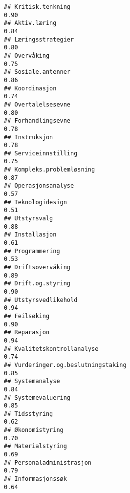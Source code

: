 \documentclass[
]{article}
\begin{document}
\begin{verbatim}
## Kritisk.tenkning                                                                 0.90
## Aktiv.læring                                                                     0.84
## Læringsstrategier                                                                0.80
## Overvåking                                                                       0.75
## Sosiale.antenner                                                                 0.86
## Koordinasjon                                                                     0.74
## Overtalelsesevne                                                                 0.80
## Forhandlingsevne                                                                 0.78
## Instruksjon                                                                      0.78
## Serviceinnstilling                                                               0.75
## Kompleks.problemløsning                                                          0.87
## Operasjonsanalyse                                                                0.57
## Teknologidesign                                                                  0.51
## Utstyrsvalg                                                                      0.88
## Installasjon                                                                     0.61
## Programmering                                                                    0.53
## Driftsovervåking                                                                 0.89
## Drift.og.styring                                                                 0.90
## Utstyrsvedlikehold                                                               0.94
## Feilsøking                                                                       0.90
## Reparasjon                                                                       0.94
## Kvalitetskontrollanalyse                                                         0.74
## Vurderinger.og.beslutningstaking                                                 0.85
## Systemanalyse                                                                    0.84
## Systemevaluering                                                                 0.85
## Tidsstyring                                                                      0.62
## Økonomistyring                                                                   0.70
## Materialstyring                                                                  0.69
## Personaladministrasjon                                                           0.79
## Informasjonssøk                                                                  0.64

\end{verbatim}
\end{document}
